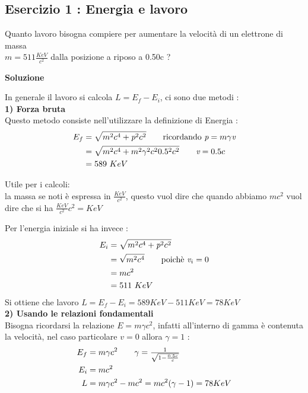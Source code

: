 \subsection{Esercizio 1 : Energia e lavoro}
Quanto lavoro bisogna compiere per aumentare la velocità di un elettrone di massa \\ 
$m = 511 \frac{KeV}{c^2}$ dalla posizione a riposo a 0.50c ? 
\begin{center}{\textbf{Soluzione}}\end{center}
In generale il lavoro si calcola $ L = E_{f} - E_{i}$, ci sono due metodi :\\ 
\textbf{1) Forza bruta} \\
Questo metodo consiste nell'utilizzare la definizione di Energia : \\ 
\begin{align*}
        E_{f} &= \sqrt{m^2c^4 + \textit{p}^2c^2} \tag*{ricordando $\textit{p} = m\gamma\textit{v}$}\\ 
          &= \sqrt{m^2c^4 +m^2\gamma^2c^20.5^2c^2} \tag*{$\textit{v} = 0.5c$}\\
          &= 589 \ KeV
\end{align*}
\begin{tcolorbox}[colback=red!5!white,colframe=red!50!black,title=ATTENZIONE !]
Utile per i calcoli: \\
la massa se noti è espressa in $\frac{KeV}{c^2}$, questo vuol dire che quando abbiamo $mc^2$ 
vuol dire che si ha $\frac{KeV}{c^2}c^2 = KeV$
\end{tcolorbox}
Per l'energia iniziale si ha invece : \\
\begin{align*}
    E_{i} &= \sqrt{m^2c^4 + \textit{p}^2c^2} \\
          &= \sqrt{m^2c^4} \tag*{poichè $\textit{v}_{i} = 0$}\\
          &= mc^2 \\
          &= 511 \ KeV
\end{align*}
Si ottiene che lavoro $L = E_{f} - E_{i} = 589 KeV - 511 KeV = 78 KeV$ \\
\textbf{2) Usando le relazioni fondamentali}\\
Bisogna ricordarsi la relazione $E = m\gamma c^2$, infatti all'interno di gamma è contenuta la 
velocità, nel caso particolare $\textit{v} = 0$ allora $\gamma = 1$ : \\
\begin{align*}
        E_{f} &= m\gamma c^2 \tag*{$\gamma = \frac{1}{\sqrt{1-\frac{0.5c}{c}}}$}\\
        E_{i} &= mc^2\\
        L &= m\gamma c^2 - mc^2 = mc^2(\gamma - 1) = 78 KeV
\end{align*}
